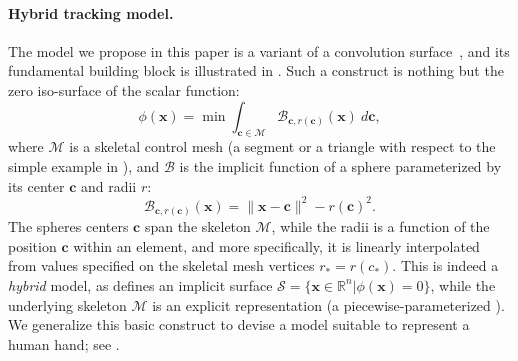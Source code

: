 \paragraph{Hybrid tracking model.}
The model we propose in this paper is a variant of a convolution surface~\cite{bloomenthal1991convolution}, and its fundamental building block is illustrated in . Such a construct is nothing but the zero iso-surface of the scalar function:
\begin{equation}
\phi(\mathbf{x}) = \min \int_{\mathbf{c} \in \mathcal{M}} \mathcal{B}_{\mathbf{c}, r(\mathbf{c})}(\mathbf{x}) \: d\mathbf{c},
\label{eq:convsurf}
\end{equation}
where $\mathcal{M}$ is a skeletal control mesh (a segment or a triangle with respect to the simple example in ), and $\mathcal{B}$ is the implicit function of a sphere parameterized by its center $\mathbf{c}$ and radii $r$:
\begin{equation}
\mathcal{B}_{\mathbf{c}, r(\mathbf{c})}(\mathbf{x}) = \|\mathbf{x}-\mathbf{c}\|^2 - r(\mathbf{c})^2.
\end{equation}
The spheres centers $\mathbf{c}$ span the skeleton $\mathcal{M}$, while the radii is a function of the position $\mathbf{c}$ within an element, and more specifically, it is linearly interpolated from values specified on the skeletal mesh vertices $r_*=r(c_*)$. This is indeed a \emph{hybrid} model, as  defines an implicit surface $\mathcal{S} = \{\mathbf{x} \in \mathbb{R}^n | \phi(\mathbf{x})=0 \}$, while the underlying skeleton $\mathcal{M}$ is an explicit representation (a piecewise-parameterized ). We generalize this basic construct to devise a model suitable to represent a human hand; see .


